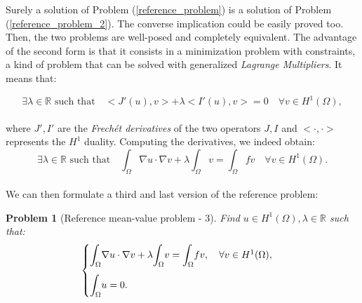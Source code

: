 \documentclass[a4paper,11pt]{article}
\newtheorem{problem}{Problem}
\begin{document}
\noindent Surely a solution of Problem (\ref{reference_problem}) is a solution of Problem (\ref{reference_problem_2}). The converse implication could be easily proved too. Then, the two problems are well-posed and completely equivalent. The advantage of the second form is that it consists in a minimization problem with constraints, a kind of problem that can be solved with generalized \emph{Lagrange Multipliers}. It means that:

\begin{equation*}
\exists \lambda \in \mathbb{R} \text{ such that} \quad <J'(u),v>+\lambda <I'(u),v>=0 \quad \forall v \in H^1(\Omega),
\end{equation*}\\
\noindent where $J',I'$ are the \emph{Frechét derivatives} of the two operators $J,I$ and $<\cdot,\cdot>$ represents the $H^1$ duality. Computing the derivatives, we indeed obtain:
\begin{equation*}
\exists \lambda \in \mathbb{R} \text{ such that} \quad \int_{\Omega}\nabla u \cdot \nabla v + \lambda \int_\Omega v = \int_{\Omega} fv \quad \forall v \in H^1(\Omega).
\end{equation*}\\

\noindent We can then formulate a third and last version of the reference problem:
\begin{problem}[Reference mean-value problem - 3]\label{reference_problem_3} Find $ u \in H^1(\Omega), \lambda \in \mathbb{R}$ such that:
	\begin{equation*}
	\begin{cases}
	\mathlarger{\int}_{\Omega}\nabla u \cdot \nabla v + \lambda \mathlarger{\int}_\Omega v = \mathlarger{\int}_{\Omega} fv, \quad \forall v \in H^1(\Omega), \\[3ex]
	\mathlarger{\int}_{\Omega}u= 0.
	\end{cases}
	\end{equation*}
\end{problem}
\end{document}

